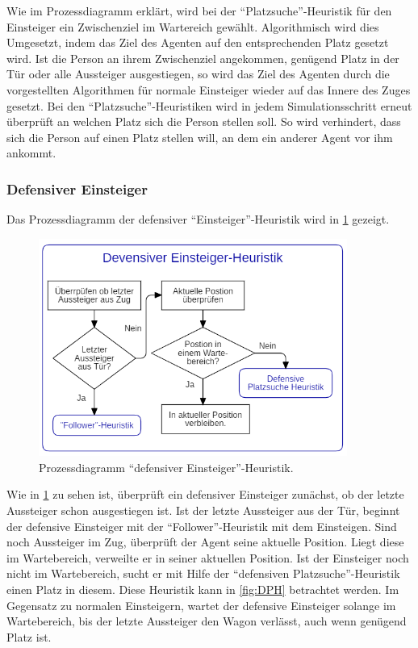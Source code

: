 Wie im Prozessdiagramm erklärt, wird bei der "`Platzsuche"'-Heuristik für den Einsteiger ein Zwischenziel im Wartereich gewählt. Algorithmisch wird dies Umgesetzt, indem das Ziel des Agenten auf den entsprechenden Platz gesetzt wird. Ist die Person an ihrem Zwischenziel angekommen, genügend Platz in der Tür oder alle Aussteiger ausgestiegen, so wird das Ziel des Agenten durch die vorgestellten Algorithmen für normale Einsteiger wieder auf das Innere des Zuges gesetzt. Bei den "`Platzsuche"'-Heuristiken wird in jedem Simulationsschritt erneut überprüft an welchen Platz sich die Person stellen soll. So wird verhindert, dass sich die Person auf einen Platz stellen will, an dem ein anderer Agent vor ihm ankommt.
\subsubsection{Defensiver Einsteiger}
Das Prozessdiagramm der defensiver "`Einsteiger"'-Heuristik wird in \ref{fig:DEH} gezeigt.
\begin{figure}[H]
	\centering
		\includegraphics[width=0.9\textwidth]{pictures/model/algorithm/boarding/defensive_boarding/defensive_boarding_heuristic.png}
	\caption{Prozessdiagramm "`defensiver Einsteiger"'-Heuristik.}
	\label{fig:DEH}
\end{figure}
Wie in \figurename \ref{fig:DEH} zu sehen ist, überprüft ein defensiver Einsteiger zunächst, ob der letzte Aussteiger schon ausgestiegen ist.  Ist der letzte Aussteiger aus der Tür, beginnt der defensive Einsteiger mit der "`Follower"'-Heuristik mit dem Einsteigen. Sind noch Aussteiger im Zug, überprüft der Agent seine aktuelle Position. Liegt diese im Wartebereich, verweilte er in seiner aktuellen Position. Ist der Einsteiger noch nicht im Wartebereich, sucht er mit Hilfe der "`defensiven Platzsuche"'-Heuristik einen Platz in diesem. Diese Heuristik kann in \figurename \ref{fig:DPH} betrachtet werden. Im Gegensatz zu normalen Einsteigern, wartet der defensive Einsteiger solange im Wartebereich, bis der letzte Aussteiger den Wagon verlässt, auch wenn genügend Platz ist. 
